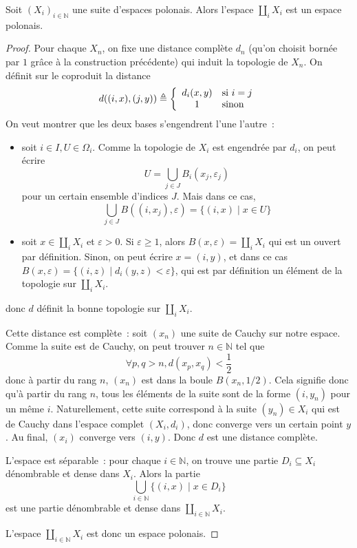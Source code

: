 \begin{proposition}
  Soit $(X_i)_{i\in \mathbb N}$ une suite d'espaces polonais. Alors l'espace
  $\coprod_i X_i$ est un espace polonais.
\end{proposition}

\begin{proof}
  Pour chaque $X_n$, on fixe une distance complète $d_n$ (qu'on choisit bornée
  par $1$ grâce à la construction précédente) qui induit la topologie de $X_n$.
  On définit sur le coproduit la distance
  \[d((i,x),(j,y)) \triangleq
  \left\{\begin{array}{cl}
  d_i(x,y) & \text{si } i = j\\
  1 & \text{sinon}
  \end{array}\right.\]
  On veut montrer que les deux bases s'engendrent l'une l'autre~:
  \begin{itemize}
  \item soit $i\in I, U \in \Omega_i$. Comme la topologie de $X_i$ est
    engendrée par $d_i$, on peut écrire
    \[U = \bigcup_{j \in J} B_i(x_j,\varepsilon_j)\]
    pour un certain ensemble d'indices $J$. Mais dans ce cas,
    \[\bigcup_{j \in J}B((i,x_j),\varepsilon) = \{(i,x)\mid x \in U\}\]
  \item soit $x\in \coprod_i X_i$ et $\varepsilon > 0$. Si
    $\varepsilon \geq 1$, alors $B(x,\varepsilon) = \coprod_i X_i$ qui est un
    ouvert par définition. Sinon, on peut écrire $x = (i,y)$, et dans ce cas
    $B(x,\varepsilon) = \{(i,z) \mid d_i(y,z) < \varepsilon\}$, qui est par
    définition un élément de la topologie sur $\coprod_i X_i$.
  \end{itemize}
  donc $d$ définit la bonne topologie sur $\coprod_i X_i$.

  Cette distance est complète~: soit $(x_n)$ une suite de Cauchy sur notre
  espace. Comme la suite est de Cauchy, on peut trouver $n\in\mathbb N$ tel que
  \[\forall p,q > n, d(x_p,x_q) < \frac{1}{2}\]
  donc à partir du rang $n$, $(x_n)$ est dans la boule $B(x_n,1/2)$.
  Cela signifie donc qu'à partir du rang $n$, tous les éléments de la suite
  sont de la forme $(i,y_n)$ pour un même $i$. Naturellement, cette suite
  correspond à la suite $(y_n) \in X_i$ qui est de Cauchy dans l'espace complet
  $(X_i,d_i)$, donc converge vers un certain point $y$. Au final, $(x_i)$
  converge vers $(i,y)$. Donc $d$ est une distance complète.

  L'espace est séparable~: pour chaque $i\in \mathbb N$, on trouve une partie
  $D_i\subseteq X_i$ dénombrable et dense dans $X_i$. Alors la partie
  \[\bigcup_{i\in \mathbb N}\{(i,x)\mid x \in D_i\}\]
  est une partie dénombrable et dense dans $\coprod_{i\in \mathbb N} X_i$.

  L'espace $\displaystyle\coprod_{i\in \mathbb N} X_i$ est donc un espace
  polonais.
\end{proof}

